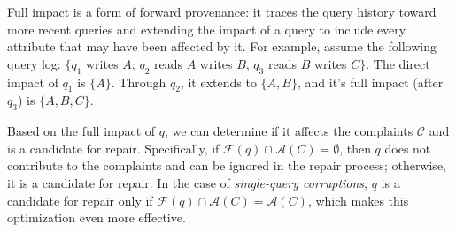 \begin{definition}
    
\end{definition}


Full impact is a form of forward provenance: it traces the query history
toward more recent queries and extending the impact of a query to include
every attribute that may have been affected by it. For example, assume the
following query log: $\{q_1$ writes $A$; $q_2$ reads $A$ writes $B$, $q_3$
reads $B$ writes $C\}$. The direct impact of $q_1$ is $\{A\}$. Through $q_2$,
it extends to $\{A,B\}$, and it's full impact (after $q_3$) is $\{A, B, C\}$.

Based on the full impact of $q$, we can determine if it affects the complaints
$\mathcal{C}$ and is a candidate for repair. Specifically, if $\mathcal{F}(q)
\cap \mathcal{A}(C)=\emptyset$, then $q$ does not contribute to the complaints
and can be ignored in the repair process; otherwise, it is a candidate for
repair. In the case of \emph{single-query corruptions}, $q$ is a candidate for
repair only if $\mathcal{F}(q) \cap \mathcal{A}(C)=\mathcal{A}(C)$, which
makes this optimization even more effective.


